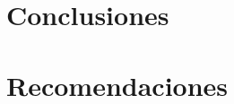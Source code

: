 

\section{Conclusiones}
\label{chapter03-section01:Conclusiones}


\section{Recomendaciones}
\label{chapter03-section01:Recomendaciones}

